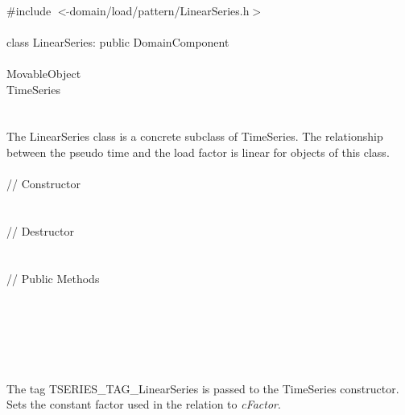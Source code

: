 
   \\
\indent \#include $<\tilde{ }$domain/load/pattern/LinearSeries.h$>$  \\

  \\
\indent class LinearSeries: public DomainComponent  \\

 \\
\indent MovableObject \\
\indent\indent TimeSeries \\
\indent\indent{} \\

 \\ 
\indent The LinearSeries class is a concrete subclass of TimeSeries.
The relationship between the pseudo time and the load factor is linear
for objects of this class. \\


 \\
\indent // Constructor \\ 
\\ \\
\indent // Destructor \\ 
\\  \\
\indent // Public Methods \\ 
\\
\\
\\
\\

 \\ 
\\ 
The tag TSERIES\_TAG\_LinearSeries is passed to the TimeSeries
constructor. Sets the constant factor used in the relation to {\em
cFactor}. \\

